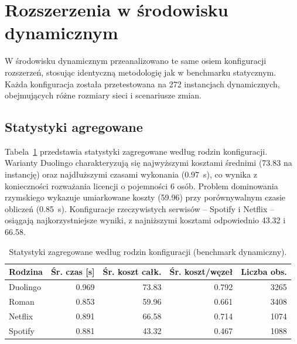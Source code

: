 \section{Rozszerzenia w środowisku dynamicznym}

W środowisku dynamicznym przeanalizowano te same osiem konfiguracji rozszerzeń, stosując identyczną metodologię jak w benchmarku statycznym. Każda konfiguracja została przetestowana na 272 instancjach dynamicznych, obejmujących różne rozmiary sieci i scenariusze zmian.

\subsection{Statystyki agregowane}

Tabela~\ref{tab:ext-dynamic-family} przedstawia statystyki zagregowane według rodzin konfiguracji. Warianty Duolingo charakteryzują się najwyższymi kosztami średnimi (73.83 na instancję) oraz najdłuższymi czasami wykonania (0.97~s), co wynika z konieczności rozważania licencji o pojemności 6 osób. Problem dominowania rzymskiego wykazuje umiarkowane koszty (59.96) przy porównywalnym czasie obliczeń (0.85~s). Konfiguracje rzeczywistych serwisów -- Spotify i Netflix -- osiągają najkorzystniejsze wyniki, z najniższymi kosztami odpowiednio 43.32 i 66.58.

\begin{table}[H]
    \centering
    \caption{Statystyki zagregowane według rodzin konfiguracji (benchmark dynamiczny).}
    \label{tab:ext-dynamic-family}
    \begin{tabular}{lrrrr}
        \toprule
        \textbf{Rodzina} & \textbf{Śr. czas [s]} & \textbf{Śr. koszt całk.} & \textbf{Śr. koszt/węzeł} & \textbf{Liczba obs.} \\
        \midrule
        Duolingo         & 0.969                 & 73.83                    & 0.792                    & 3265                 \\
        Roman            & 0.853                 & 59.96                    & 0.661                    & 3408                 \\
        Netflix          & 0.891                 & 66.58                    & 0.714                    & 1074                 \\
        Spotify          & 0.881                 & 43.32                    & 0.467                    & 1088                 \\
        \bottomrule
    \end{tabular}
\end{table}

